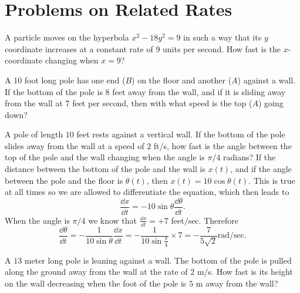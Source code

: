 \section{Problems on Related Rates} 
\problemfont 
\begin{multicols}{2}\setlength{\parindent}{0pt}
\problem A particle moves on the hyperbola $x^2-18 y^2=9$ in such a way 
that its $y$ coordinate increases at a constant rate of $9$ units per
second. How fast is the $x$-coordinate changing when $x = 9$?
  
  
\problem A 10 foot long pole has one end ($B$) on the floor and another 
($A$) against a wall.  If the bottom of the pole is 8 feet away from the
wall, and if it is sliding away from the wall at 7 feet per second, then
with what speed is the top ($A$) going down?













\problem A pole of length $10$ feet rests against a vertical wall.  If 
the bottom of the pole slides away from the wall at a speed of $2$
ft/s, how fast is the angle between the top of the pole and the wall
changing when the angle is $\pi/4$ radians?
\answer 
If the distance between the bottom of the pole and the wall is $x(t)$,
and if the angle between the pole and the floor is $\theta(t)$, then
$x(t) = 10 \cos \theta(t)$.  This is true at all times so we are
allowed to differentiate the equation, which then leads to
\[
\frac{\dd x} {\dd t} = -10\sin\theta \frac{\dd \theta} {\dd t}.
\]
When the angle is $\pi/4$ we know that $\frac{\dd x} {\dd t} = +7$ feet$/$sec.
Therefore
\[
\frac{\dd \theta} {\dd t}
= -\frac{1} {10\sin\theta} \frac{\dd x} {\dd t}
= -\frac{1} {10\sin\frac\pi4} \times 7
= - \frac{7} {5\surd 2} \mathrm{rad}/\mathrm{sec}.
\]
\endanswer




\problem A $13$ meter long pole is leaning against a wall.  The bottom 
of the pole is pulled along the ground away from the wall at the rate
of $2$ m/s.  How fast is its height on the wall decreasing when the
foot of the pole is $5$ m away from the wall?









\end{multicols}
